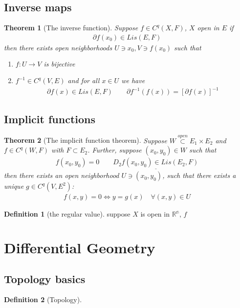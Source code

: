 \documentclass[12pt,fleqn]{book}
\newtheorem{theorem}{Theorem}[section]
\theoremstyle{definition}
\newtheorem{definition}{Definition}[section]
\begin{document}
\subsection{Inverse maps}

\begin{theorem}[The inverse function]
	Suppose $f \in C^q(X, F)$, $X$ open in $E$ if 
	\begin{align*}
		\partial f(x_0) \in Lis(E, F)
	\end{align*}
	then there exists open neighborhoods $U \ni x_0, V \ni f(x_0)$ such that
	\begin{enumerate}
		\item  $f: U \rightarrow V$ is bijective
		\item $f^{-1} \in C^q(V, E)$ and for all $x \in U$ we have
			\begin{align*}
				\partial f(x) \in Lis(E, F) \qquad 
				\partial f^{-1} (f(x)) = [\partial f(x)]^{-1}
			\end{align*}
	\end{enumerate}
\end{theorem}


\subsection{Implicit functions}
\begin{theorem}[The implicit function theorem]
	Suppose $W \overset{open}{\subset} E_1 \times E_2$ and $f \in C^q(W, F)$ with $F \subset E_2$. Further, suppose $(x_0, y_0) \in W$ such that
	\begin{align*}
		f(x_0, y_0) = 0 \qquad \underline{ D_2 f(x_0, y_0) \in Lis(E_2, F)}
	\end{align*}
	then there exists an open neighborhood $U \ni (x_0, y_0)$, such that there exists a unique $g \in C^q(V, E^2)$:
	\begin{align*}
		f(x, y) = 0 \Leftrightarrow y = g(x) \quad \forall (x, y) \in U
	\end{align*}
\end{theorem}

\begin{definition}[the regular value]
	suppose $X$ is open in $\mathbb{R^n}$, $f $ 
\end{definition}


\section{Differential Geometry}
\subsection{Topology basics}
\begin{definition}[Topology]
\end{definition}
\end{document}

